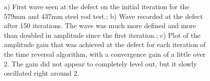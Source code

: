 \documentclass[11pt,letterpaper]{article}%
\begin{document}
 \begin{figure}
\begin{subfigmatrix}{3}
\end{subfigmatrix}

   \caption[all]
   { \label{steelExp1}
   a) First wave seen at the defect on the initial iteration for the 579mm and 437mm steel rod test.; b) Wave recorded at the defect after 150 iterations. The wave was much more defined and more than doubled in amplitude since the first iteration.; c) Plot of the amplitude gain that was achieved at the defect for each iteration of the time reversal algorithm, with a convergence gain of a little over 2. The gain did not appear to completely level out, but it slowly oscillated right around 2.
 }
\end{figure}
\end{document}

